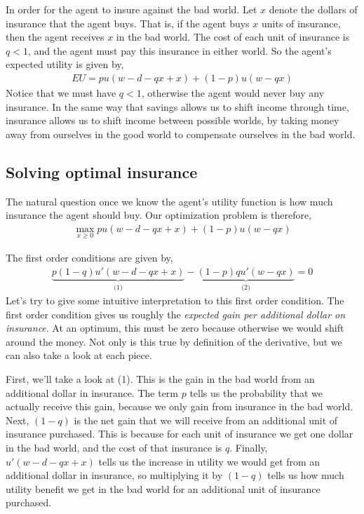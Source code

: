 In order for the agent to insure against the bad world. Let $x$ denote the dollars of insurance that the agent buys. That is, if the agent buys $x$ units of insurance, then the agent receives $x$ in the bad world. The cost of each unit of insurance is $q < 1$, and the agent must pay this insurance in either world. So the agent's expected utility is given by,
\begin{align*}
    EU = p u(w - d - qx + x) + (1 - p) u(w - qx) 
\end{align*}
Notice that we must have $q < 1$, otherwise the agent would never buy any insurance. In the same way that savings allows us to shift income through time, insurance allows us to shift income between possible worlds, by taking money away from ourselves in the good world to compensate ourselves in the bad world. 

\subsection*{Solving optimal insurance}
The natural question once we know the agent's utility function is how much insurance the agent should buy. Our optimization problem is therefore,
\begin{align*}
    \max_{x \geq 0} p u(w - d - qx + x) + (1 - p) u(w - qx)
\end{align*}

The first order conditions are given by,
\begin{align*}
    \underbrace{p (1 - q) u'(w - d - qx + x)}_{\text{(1)}} - \underbrace{(1 - p) q u'(w - qx)}_{\text{(2)}} = 0
\end{align*}
Let's try to give some intuitive interpretation to this first order condition. The first order condition gives us roughly the \emph{expected gain per additional dollar on insurance}. At an optimum, this must be zero because otherwise we would shift around the money. Not only is this true by definition of the derivative, but we can also take a look at each piece.

First, we'll take a look at (1). This is the gain in the bad world from an additional dollar in insurance. The term $p$ tells us the probability that we actually receive this gain, because we only gain from insurance in the bad world. Next, $(1 - q)$ is the net gain that we will receive from an additional unit of insurance purchased. This is because for each unit of insurance we get one dollar in the bad world, and the cost of that insurance is $q$. Finally, $u'(w - d - qx + x)$ tells us the increase in utility we would get from an additional dollar in insurance, so multiplying it by $(1 - q)$ tells us how much utility benefit we get in the bad world for an additional unit of insurance purchased.

